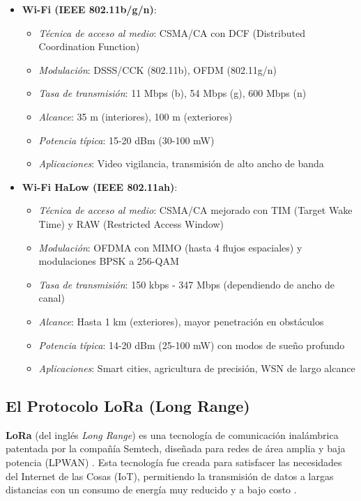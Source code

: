 \begin{itemize}
    \item \textbf{Wi-Fi (IEEE 802.11b/g/n)}:
        \begin{itemize}
            \item \textit{Técnica de acceso al medio}: CSMA/CA con DCF (Distributed Coordination Function)
            \item \textit{Modulación}: DSSS/CCK (802.11b), OFDM (802.11g/n)
            \item \textit{Tasa de transmisión}: 11 Mbps (b), 54 Mbps (g), 600 Mbps (n)
            \item \textit{Alcance}: 35 m (interiores), 100 m (exteriores)
            \item \textit{Potencia típica}: 15-20 dBm (30-100 mW)
            \item \textit{Aplicaciones}: Video vigilancia, transmisión de alto ancho de banda \cite{gerenciatecnologicainformatica2013}
        \end{itemize}
    
    \item \textbf{Wi-Fi HaLow (IEEE 802.11ah)}:
        \begin{itemize}
            \item \textit{Técnica de acceso al medio}: CSMA/CA mejorado con TIM (Target Wake Time) y RAW (Restricted Access Window)
            \item \textit{Modulación}: OFDMA con MIMO (hasta 4 flujos espaciales) y modulaciones BPSK a 256-QAM
            \item \textit{Tasa de transmisión}: 150 kbps - 347 Mbps (dependiendo de ancho de canal)
            \item \textit{Alcance}: Hasta 1 km (exteriores), mayor penetración en obstáculos
            \item \textit{Potencia típica}: 14-20 dBm (25-100 mW) con modos de sueño profundo
            \item \textit{Aplicaciones}: Smart cities, agricultura de precisión, WSN de largo alcance \cite{Adame2014}
        \end{itemize}
\end{itemize}

\subsection{El Protocolo LoRa (Long Range)}
\label{subsec:lora}

\textbf{LoRa} (del inglés \textit{Long Range}) es una tecnología de comunicación inalámbrica patentada por la compañía Semtech, diseñada para redes de área amplia y baja potencia (LPWAN) \cite{devalal2018_overview}. Esta tecnología fue creada para satisfacer las necesidades del Internet de las Cosas (IoT), permitiendo la transmisión de datos a largas distancias con un consumo de energía muy reducido y a bajo costo \cite{jebril2018_overcoming, staikopoulos2020_survey}.


